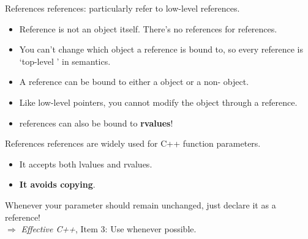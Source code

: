 \documentclass{beamer}
\begin{document}
\begin{frame}[fragile]{References}
     references: particularly refer to low-level  references.
    \begin{itemize}
        \item Reference is not an object itself. There's no references for references.
        \item You can't change which object a reference is bound to, so every reference is `top-level ' in semantics.
        \pause
        \item A  reference can be bound to either a  object or a non- object.
        \item Like low-level  pointers, you cannot modify the object through a  reference.
        \pause
        \item {} references can also be bound to \textbf{rvalues}!
    \end{itemize}
\end{frame}

\begin{frame}[fragile]{References}
     references are widely used for C++ function parameters.
    \begin{itemize}
        \item It accepts both lvalues and rvalues.
        \item \textbf{It avoids copying}.
    \end{itemize}
    Whenever your parameter should remain unchanged, just declare it as a  reference!\\
    \(\Rightarrow\) \textit{Effective C++}, Item 3: Use  whenever possible.
\end{frame}
\end{document}
